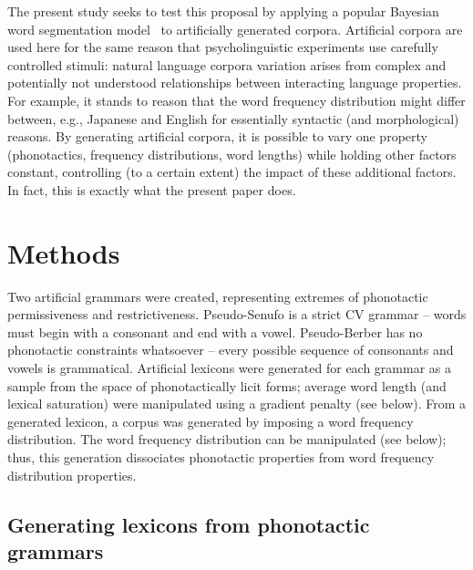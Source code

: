 \documentclass[11pt]{article}
\begin{document}
The present study seeks to test this proposal by applying a popular Bayesian word segmentation model~\cite{Brent99a,Goldwater07c,Goldwater09a} to artificially generated corpora. Artificial corpora are used here for the same reason that psycholinguistic experiments use carefully controlled stimuli: natural language corpora variation arises from complex and potentially not understood relationships between interacting language properties. For example, it stands to reason that the word frequency distribution might differ between, e.g., Japanese and English for essentially syntactic (and morphological) reasons. By generating artificial corpora, it is possible to vary one property (phonotactics, frequency distributions, word lengths) while holding other factors constant, controlling (to a certain extent) the impact of these additional factors. In fact, this is exactly what the present paper does.

\section{Methods}
\vspace*{-5pt}
Two artificial grammars were created, representing extremes of phonotactic permissiveness and restrictiveness. Pseudo-Senufo is a strict CV grammar -- words must begin with a consonant and end with a vowel.
Pseudo-Berber has no phonotactic constraints whatsoever -- every possible sequence of consonants and vowels is grammatical. Artificial lexicons were generated for each grammar as a sample from the space of phonotactically licit forms; average word length (and lexical saturation) were manipulated using a gradient penalty (see below). From a generated lexicon, a corpus was generated by imposing a word frequency distribution. The word frequency distribution can be manipulated (see below); thus, this generation dissociates phonotactic properties from word frequency distribution properties.
 
\subsection{Generating lexicons from phonotactic grammars}
\end{document}
